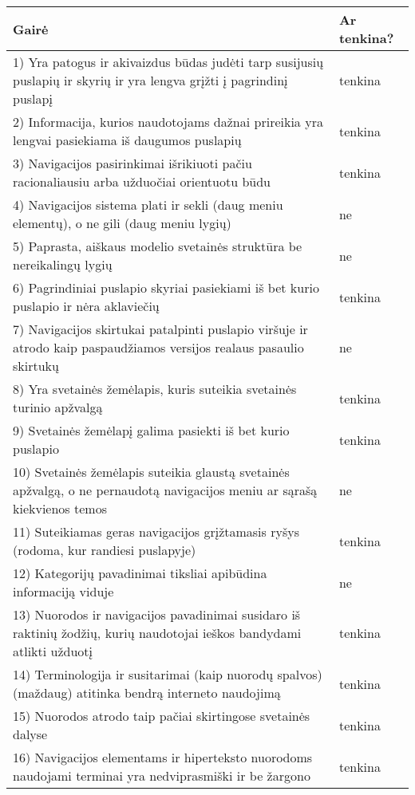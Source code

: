 \documentclass{VUMIFPSkursinis}
\begin{document}
\begin{center}
\begin{longtable}{ |p{}|p{2cm}| } 
 \hline
	Gairė & Ar tenkina? \\ \hline
	1) Yra patogus ir akivaizdus būdas judėti tarp susijusių puslapių ir skyrių ir yra lengva grįžti į pagrindinį puslapį & tenkina \\ \hline
	2) Informacija, kurios naudotojams dažnai prireikia yra lengvai pasiekiama iš daugumos puslapių & tenkina \\ \hline
	3) Navigacijos pasirinkimai išrikiuoti pačiu racionaliausiu arba užduočiai orientuotu būdu & tenkina \\ \hline
	4) Navigacijos sistema plati ir sekli (daug meniu elementų), o ne gili (daug meniu lygių)  & ne \\ \hline
	5) Paprasta, aiškaus modelio svetainės struktūra be nereikalingų lygių & ne \\ \hline
	6) Pagrindiniai puslapio skyriai pasiekiami iš bet kurio puslapio ir nėra aklaviečių & tenkina \\ \hline
	7) Navigacijos skirtukai patalpinti puslapio viršuje ir atrodo kaip paspaudžiamos versijos realaus pasaulio skirtukų & ne \\ \hline
	8) Yra svetainės žemėlapis, kuris suteikia svetainės turinio apžvalgą & tenkina \\ \hline
	9) Svetainės žemėlapį galima pasiekti iš bet kurio puslapio & tenkina \\ \hline
	10) Svetainės žemėlapis suteikia glaustą svetainės apžvalgą, o ne pernaudotą navigacijos meniu ar sąrašą kiekvienos temos & ne \\ \hline
	11) Suteikiamas geras navigacijos grįžtamasis ryšys (rodoma, kur randiesi puslapyje) & tenkina \\ \hline
	12) Kategorijų pavadinimai tiksliai apibūdina informaciją viduje & ne \\ \hline
	13) Nuorodos ir navigacijos pavadinimai susidaro iš raktinių žodžių, kurių naudotojai ieškos bandydami atlikti užduotį & tenkina \\ \hline
	14) Terminologija ir susitarimai (kaip nuorodų spalvos) (maždaug) atitinka bendrą interneto naudojimą & tenkina \\ \hline
	15) Nuorodos atrodo taip pačiai skirtingose svetainės dalyse & tenkina \\ \hline
	16) Navigacijos elementams ir hiperteksto nuorodoms naudojami terminai yra nedviprasmiški ir be žargono & tenkina \\ \hline

\end{longtable}
\end{center}
\end{document}
